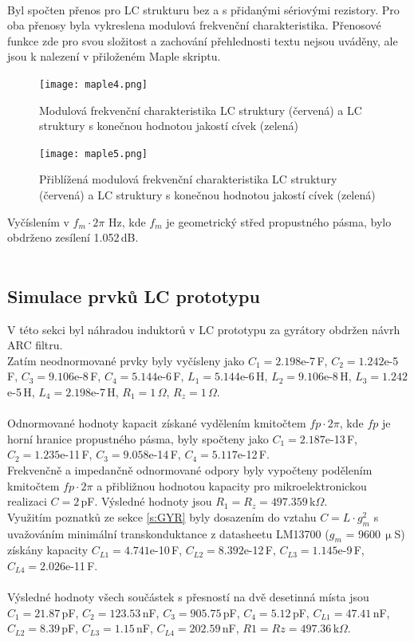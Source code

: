 \\
\noindent Byl spočten přenos pro LC strukturu bez a s přidanými sériovými rezistory. Pro oba přenosy byla vykreslena modulová frekvenční charakteristika. Přenosové funkce zde pro svou složitost a zachování přehlednosti textu nejsou uváděny, ale jsou k nalezení v přiloženém Maple skriptu.
\begin{figure}[h]
\centering
\texttt{[image: maple4.png]}
\caption[Modulová frekvenční charakteristika LC struktury a LC struktury s konečnou hodnotou jakostí cívek]{Modulová frekvenční charakteristika LC struktury (červená) a LC struktury s konečnou hodnotou jakostí cívek (zelená)}
\end{figure}
\begin{figure}[h]
\centering
\texttt{[image: maple5.png]}
\caption[Přiblížená modulová frekvenční charakteristika LC struktury a LC struktury s konečnou hodnotou jakostí cívek]{Přiblížená modulová frekvenční charakteristika LC struktury (červená) a LC struktury s konečnou hodnotou jakostí cívek (zelená)}
\end{figure}
\noindent Vyčíslením v $f_m \cdot 2 \pi$ Hz, kde $f_m$ je geometrický střed propustného pásma, bylo obdrženo zesílení 1.052\,dB.\\
\\
\subsection{Simulace prvků LC prototypu}\label{s:ARC123}
V této sekci byl náhradou induktorů v LC prototypu za gyrátory obdržen návrh ARC filtru.\\
Zatím neodnormované prvky byly vyčísleny jako $C_1 = 2.198$e-7\,F, $C_2 = 1.242$e-5\,F, $C_3 = 9.106$e-8\,F, $C_4 = 5.144$e-6\,F, $L_1 = 5.144$e-6\,H, $L_2 = 9.106$e-8\,H, $L_3 = 1.242$e-5\,H, $L_4 = 2.198$e-7\,H, $R_1 = 1$\,$\Omega$, $R_z = 1$\,$\Omega$.\\
\\
\noindent Odnormované hodnoty kapacit získané vydělením kmitočtem $fp \cdot 2 \pi$, kde $fp$ je horní hranice propustného pásma, byly spočteny jako $C_1 = 2.187$e-13\,F, $C_2 = 1.235$e-11\,F, $C_3 = 9.058$e-14\,F, $C_4 = 5.117$e-12\,F.\\
\noindent Frekvenčně a impedančně odnormované odpory byly vypočteny podělením kmitočtem $fp \cdot 2 \pi$ a přibližnou hodnotou kapacity pro mikroelektronickou realizaci $C = 2$\,pF. Výsledné hodnoty jsou $R_1 = R_z = 497.359$\,k$\Omega$.\\
\noindent Využitím poznatků ze sekce \ref{s:GYR} byly dosazením do vztahu $C = L \cdot g_m^2$ s uvažováním minimální transkonduktance z datasheetu LM13700 ($g_m$ = 9600\,$\upmu$S) získány kapacity $C_{L1} = 4.741$e-10\,F, $C_{L2} = 8.392$e-12\,F, $C_{L3} = 1.145$e-9\,F, $C_{L4} = 2.026$e-11\,F.\\
\\
\noindent Výsledné hodnoty všech součástek s přesností na dvě desetinná místa jsou\\ $C_1 = 21.87$\,pF, $C_2 = 123.53$\,nF, $C_3 = 905.75$\,pF, $C_4 = 5.12$\,pF, $C_{L1} = 47.41$\,nF, $C_{L2} = 8.39$\,pF, $C_{L3} = 1.15$\,nF, $C_{L4} = 202.59$\,nF, $R1 = Rz = 497.36$\,k$\Omega$.
